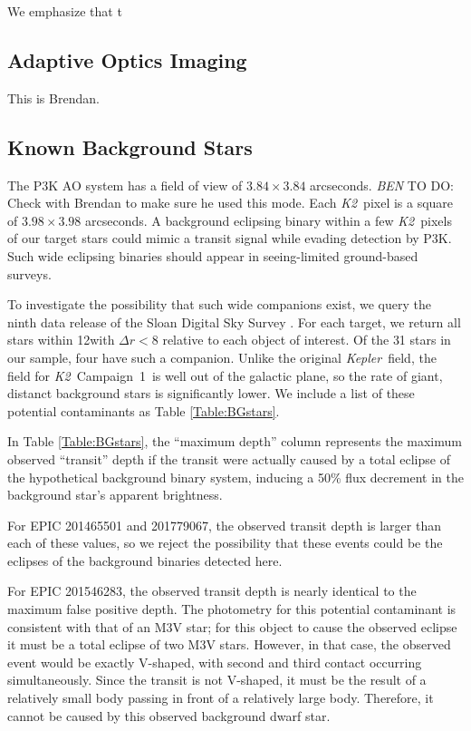 \documentclass{emulateapj}
\newcommand{\project}[1]{\textsl{#1}}
\newcommand{\kep}{\project{Kepler}}
\newcommand{\KT}{\project{K2}}
\newcommand{\Ci}{Campaign~1}
\newcommand{\todo}[3]{{\color{#2} \emph{#1} TO DO: #3}}
\newcommand{\btmtodo}[1]{\todo{BEN}{red}{#1}}
\begin{document}
We emphasize that t

\subsection{Adaptive Optics Imaging}

This is Brendan.




\subsection{Known Background Stars}
The P3K AO system has a field of view of $3.84 \times 3.84$ arcseconds.
\btmtodo{Check with Brendan to make sure he used this mode}.
Each \KT\ pixel is a square of $3.98 \times 3.98$ arcseconds.
A background eclipsing binary within a few \KT\ pixels of our target
stars could mimic a transit signal while evading detection by P3K.
Such wide eclipsing binaries should appear in seeing-limited ground-based
surveys.

To investigate the possibility that such wide companions exist,
we query the ninth data release of the Sloan Digital Sky Survey
\citep[SDSS DR9,][]{Ahn12}.
For each target, we return
all stars within 12\arcsec with $\Delta r < 8$ relative to each object
of interest.
Of the 31 stars in our sample, four have such a companion.
Unlike the original \kep\ field, the field for \KT\ \Ci\ is
well out of the galactic plane, so the rate of giant, distanct background
stars is significantly lower.
We include a list of these potential contaminants as Table
\ref{Table:BGstars}.


In Table \ref{Table:BGstars}, the ``maximum depth'' column represents
the maximum observed ``transit'' depth if the transit were actually caused
by a total eclipse of the hypothetical background binary system, inducing
a 50\% flux decrement in the background star's apparent brightness.

For EPIC 201465501 and 201779067, the observed transit depth is
larger than each of these values, so we reject the possibility that
these events could be the eclipses of the background binaries detected
here.

For EPIC 201546283, the observed transit depth is nearly identical to
the maximum false positive depth.
The photometry for this potential contaminant is consistent with that
of an M3V star; for this object to cause the observed eclipse it must
be a total eclipse of two M3V stars.
However, in that case, the observed event would be exactly V-shaped,
with second and third contact occurring simultaneously.
Since the transit is not V-shaped, it must be the result of
a relatively small body passing in front of a relatively large body.
Therefore, it cannot be caused by this observed background dwarf star.
\end{document}
